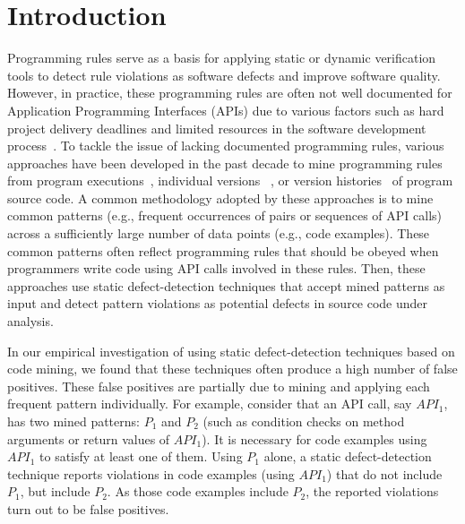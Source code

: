 \section{Introduction}
\label{sec:intro}

Programming rules serve as a basis for applying static or dynamic verification tools to detect rule violations as software defects and improve software quality. However, in practice, these programming rules are often not well documented for Application Programming Interfaces (APIs) due to various factors such as hard project delivery deadlines and limited resources in the software development process~\cite{document:leth}. To tackle the issue of lacking documented programming rules, various approaches have been developed in the past decade to mine programming rules from program executions~\cite{ernst01:dynamically,ammons02mining,yang2006pmt}, individual versions ~\cite{Engler2001deviant,Zhenmin2005PRMiner,acharya06:mining,ramanathan07:path,shoham07:static,chang07:finding,acharya07:mining,wasylkowski07:detecting}, or version histories~\cite{livshits05dynamine,Chadd2005rule} of program source code. A common methodology adopted by these approaches is to mine common patterns (e.g., frequent occurrences of pairs or sequences of
API calls) across a sufficiently large number of data points (e.g., code examples). These common patterns often reflect programming rules that should be obeyed when programmers write code using API calls involved in these rules. Then, these approaches use static defect-detection techniques that accept mined patterns as input and detect pattern violations as potential defects in source code under analysis.

In our empirical investigation of using static defect-detection techniques based on code mining, we found that these techniques often produce a high number of false positives. These false positives are partially due to mining and applying each frequent pattern individually. For example, consider that an API call, say $API_1$, has two mined patterns: $P_1$ and $P_2$ (such as condition checks on method arguments or return values of $API_1$). It is necessary for code examples using $API_1$ to satisfy at least one of them. Using $P_1$ alone, a static defect-detection technique reports violations in code examples (using $API_1$) that do not include $P_1$, but include $P_2$. As those code examples include $P_2$, the reported violations turn out to be false positives.

